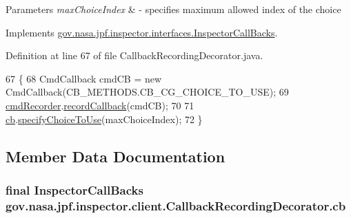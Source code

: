 \begin{DoxyParams}{Parameters}
{\em max\+Choice\+Index} & -\/ specifies maximum allowed index of the choice \\
\hline
\end{DoxyParams}


Implements \hyperlink{interfacegov_1_1nasa_1_1jpf_1_1inspector_1_1interfaces_1_1_inspector_call_backs_a95bd37f4f3ad147514c86fa77856b51d}{gov.\+nasa.\+jpf.\+inspector.\+interfaces.\+Inspector\+Call\+Backs}.



Definition at line 67 of file Callback\+Recording\+Decorator.\+java.


\begin{DoxyCode}
67                                                       \{
68     CmdCallback cmdCB = \textcolor{keyword}{new} CmdCallback(CB\_METHODS.CB\_CG\_CHOICE\_TO\_USE);
69     \hyperlink{classgov_1_1nasa_1_1jpf_1_1inspector_1_1client_1_1_callback_recording_decorator_a5bfada9e89b8d63d85607b33b6acb0aa}{cmdRecorder}.\hyperlink{classgov_1_1nasa_1_1jpf_1_1inspector_1_1client_1_1_command_recorder_abe21b5a43baac419c36c34b5f35e2e50}{recordCallback}(cmdCB);
70 
71     \hyperlink{classgov_1_1nasa_1_1jpf_1_1inspector_1_1client_1_1_callback_recording_decorator_a12851029ed70d54263ba4d4a3e10ea90}{cb}.\hyperlink{interfacegov_1_1nasa_1_1jpf_1_1inspector_1_1interfaces_1_1_inspector_call_backs_a95bd37f4f3ad147514c86fa77856b51d}{specifyChoiceToUse}(maxChoiceIndex);
72   \}
\end{DoxyCode}


\subsection{Member Data Documentation}
\subsubsection[{\texorpdfstring{cb}{cb}}]{\setlength{\rightskip}{0pt plus 5cm}final {\bf Inspector\+Call\+Backs} gov.\+nasa.\+jpf.\+inspector.\+client.\+Callback\+Recording\+Decorator.\+cb\hspace{0.3cm}{\ttfamily [private]}}\hypertarget{classgov_1_1nasa_1_1jpf_1_1inspector_1_1client_1_1_callback_recording_decorator_a12851029ed70d54263ba4d4a3e10ea90}{}\label{classgov_1_1nasa_1_1jpf_1_1inspector_1_1client_1_1_callback_recording_decorator_a12851029ed70d54263ba4d4a3e10ea90}


